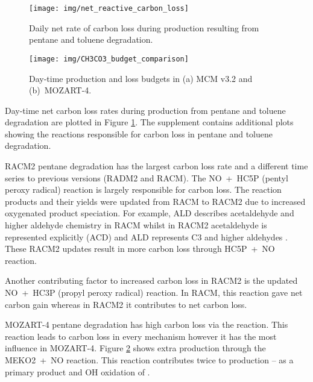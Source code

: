 \begin{figure}
    \centering
    \texttt{[image: img/net\_reactive\_carbon\_loss]}
    \vspace{0mm}
    \caption{Daily net rate of carbon loss during  production resulting from pentane and toluene degradation.}
    \vspace{-4mm}
    \label{f:net_carbon_loss}
\end{figure}

\begin{figure}
    \centering
    \texttt{[image: img/CH3CO3\_budget\_comparison]}
    \vspace{0mm}
    \caption{Day-time  production and loss budgets in (a) MCM v3.2 and \mbox{(b) MOZART-4}.}
    \vspace{-4mm}
    \label{f:CH3CO3_budget}
\end{figure}

Day-time net carbon loss rates during  production from pentane and toluene degradation are plotted in Figure \ref{f:net_carbon_loss}.
The supplement contains additional plots showing the reactions responsible for carbon loss in pentane and toluene degradation.

RACM2 pentane degradation has the largest carbon loss rate and a different time series to previous versions (RADM2 and RACM).  
The \mbox{NO + HC5P} (pentyl peroxy radical) reaction is largely responsible for carbon loss.
The reaction products and their yields were updated from RACM to RACM2 due to increased oxygenated product speciation.
For example, ALD describes acetaldehyde and higher aldehyde chemistry in RACM whilst in RACM2 acetaldehyde is represented explicitly (ACD) and ALD represents C3 and higher aldehydes \citep{Goliff:2013}.
These RACM2 updates result in more carbon loss through \mbox{HC5P + NO} reaction.

Another contributing factor to increased carbon loss in RACM2 is the updated \mbox{NO + HC3P} (propyl peroxy radical) reaction.
In RACM, this reaction gave net carbon gain whereas in RACM2 it contributes to net carbon loss.

MOZART-4 pentane degradation has high carbon loss via the  reaction.
This reaction leads to carbon loss in every mechanism however it has the most influence in MOZART-4. 
Figure \ref{f:CH3CO3_budget} shows extra  production through the \mbox{MEKO2 + NO} reaction.
This reaction contributes twice to  production -- as a primary product and OH oxidation of .


